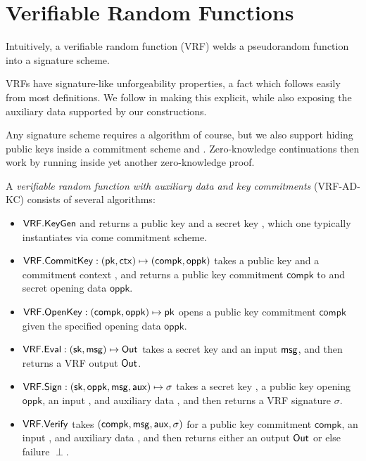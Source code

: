 
\section{Verifiable Random Functions}
\label{sec:vrf}

Intuitively, a verifiable random function (VRF) welds a pseudorandom function into a signature scheme.

VRFs have signature-like unforgeability properties, a fact which follows easily from most definitions. 
We follow \cite{agg_dkg} in making this explicit, while also
 exposing the auxiliary data supported by our constructions. 

\def\compk{\ensuremath{\mathsf{compk}}\xspace}
\def\openpk{\ensuremath{\mathsf{oppk}}\xspace}
\newcommand\CommitKey{\primalgo{CommitKey}}
\newcommand\OpenKey{\primalgo{OpenKey}}

Any signature scheme requires a \KeyGen algorithm of course, but we also
support hiding public keys inside a commitment scheme \CommitKey and \OpenKey.
Zero-knowledge continuations then work by running \OpenKey inside yet
another zero-knowledge proof. 

\begin{definition}
A {\em verifiable random function with auxiliary data and key commitments} (VRF-AD-KC) consists of several algorithms:
\begin{itemize}
\item ${\mathsf{VRF}}.{\mathsf{KeyGen}}$ and returns a public key \pk and a secret key \sk, which one typically instantiates via come commitment scheme. 
%
\item $\VRF.\CommitKey : (\pk,\ctx) \mapsto (\compk,\openpk)$ takes a public key \pk and a commitment context \ctx, and returns a public key commitment \compk to \sk and secret opening data \openpk.
\item $\VRF.\OpenKey : (\compk,\openpk) \mapsto \pk$ opens a public key commitment \compk given the specified opening data \openpk.
%
\item ${\mathsf{VRF}}.{\mathsf{Eval}} : (\mathsf{sk},\mathsf{msg}) \mapsto {\ensuremath{\mathsf{Out}}}$ takes a secret key \sk and an input $\mathsf{msg}$, and then returns a VRF output ${\mathsf{Out}}$.
\item $\VRF.\Sign : (\sk,\openpk,\msg,\aux) \mapsto \sigma$ takes a secret key \sk, a public key opening \openpk, an input \msg, and auxiliary data \aux, and then returns a VRF signature $\sigma$.
\item ${\mathsf{VRF}}.{\mathsf{Verify}}$ takes $(\compk,\msg,\aux,\sigma)$ for a public key commitment \compk, an input \msg, and auxiliary data \aux, and then returns either an output ${\mathsf{Out}}$ or else failure $\perp$.
\end{itemize}
\end{definition}

